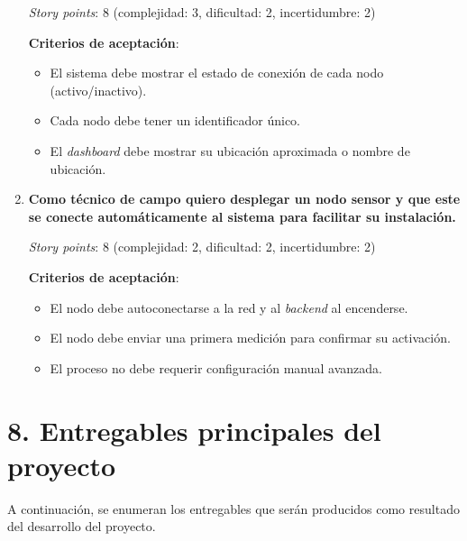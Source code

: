 \documentclass[
11pt, %
]{charter}
\begin{document}
\begin{enumerate}
    \textit{Story points}: 8 (complejidad: 3, dificultad: 2, incertidumbre: 2)

    \textbf{Criterios de aceptación}:
    \begin{itemize}
        \item El sistema debe mostrar el estado de conexión de cada nodo (activo/inactivo).
        \item Cada nodo debe tener un identificador único.
        \item El \textit{dashboard} debe mostrar su ubicación aproximada o nombre de ubicación.
    \end{itemize}

    \item \textbf{Como técnico de campo quiero desplegar un nodo sensor y que este se conecte automáticamente al sistema para facilitar su instalación.}

    \textit{Story points}: 8 (complejidad: 2, dificultad: 2, incertidumbre: 2)

    \textbf{Criterios de aceptación}:
    \begin{itemize}
        \item El nodo debe autoconectarse a la red y al \textit{backend} al encenderse.
        \item El nodo debe enviar una primera medición para confirmar su activación.
        \item El proceso no debe requerir configuración manual avanzada.
    \end{itemize}
\end{enumerate}

\section{8. Entregables principales del proyecto}
\label{sec:entregables}

A continuación, se enumeran los entregables que serán producidos como resultado del desarrollo del proyecto. 
\end{document}
